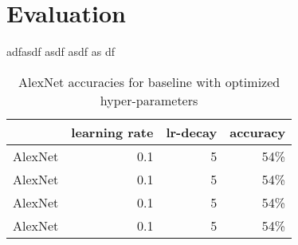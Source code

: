 \chapter{Evaluation}

adfasdf
asdf
asdf
as
df


\begin{table}[t] \centering
{}
\caption{AlexNet accuracies for baseline with optimized hyper-parameters}
\begin{tabular}{@{}rrrr@{}}
\toprule & learning rate & lr-decay & accuracy \\
\midrule
AlexNet		& 0.1 		& 5		& 54\%  \\
AlexNet		& 0.1 		& 5		& 54\%  \\
AlexNet		& 0.1 		& 5		& 54\%  \\
AlexNet		& 0.1 		& 5		& 54\%  \\
\bottomrule
\end{tabular}
\label{tbl:similarity-test-map}
\end{table}
